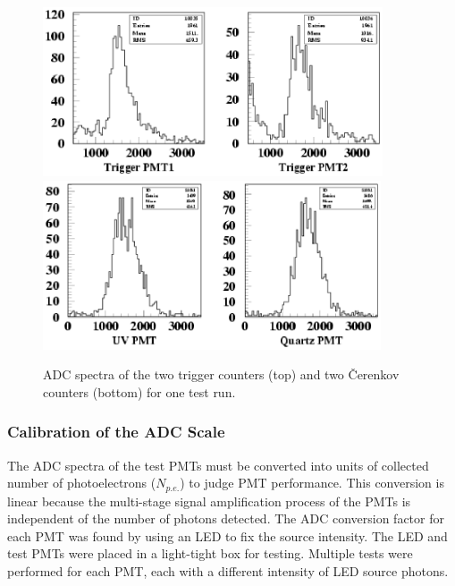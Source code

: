 \begin{figure}
\vspace{0.5cm}\begin{centering}
\includegraphics[height=5.0cm]{PMT-studies/triggers.eps}
\includegraphics[height=5.0cm]{PMT-studies/cerenk_counters.eps}
\vspace{0.5cm}
\caption{\small{ADC spectra of the two trigger counters (top) and two 
{\v C}erenkov counters (bottom) for one test run.}}
\label{sample_adc}
\end{centering}
\end{figure}

\subsubsection{Calibration of the ADC Scale}

The ADC spectra of the test PMTs must be converted into units of collected
number of photoelectrons ($N_{p.e.}$) to judge PMT performance.  This 
conversion is linear because the multi-stage signal amplification process 
of the PMTs is independent of the number of photons detected.  The ADC
conversion factor for each PMT was found by using an LED to fix the
source intensity.  The LED and test PMTs were placed in a light-tight
box for testing.  Multiple tests were performed for each PMT, each
with a different intensity of LED source photons. 

